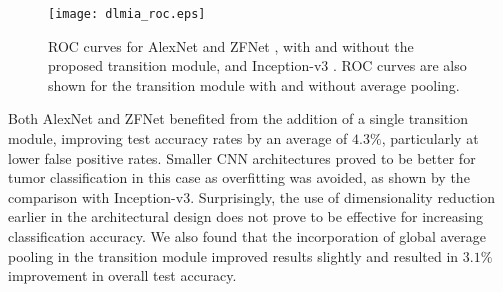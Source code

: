 \documentclass[runningheads,a4paper]{llncs}
\begin{document}
\begin{figure}[t]
	\centering
	\texttt{[image: dlmia\_roc.eps]}
	\caption{ROC curves for AlexNet \cite{Krizhevsky2012} and ZFNet \cite{Zeiler2013}, with and without the proposed transition module, and Inception-v3 \cite{Szegedy2016}. ROC curves are also shown for the transition module with and without average pooling.}
	\label{fig:roc}
\end{figure}



Both AlexNet and ZFNet benefited from the addition of a single transition module, improving test accuracy rates by an average of $4.3\%$, particularly at lower false positive rates. Smaller CNN architectures proved to be better for tumor classification in this case as overfitting was avoided, as shown by the comparison with Inception-v3. Surprisingly, the use of dimensionality reduction earlier in the architectural design does not prove to be effective for increasing classification accuracy.
We also found that the incorporation of global average pooling in the transition module improved results slightly and resulted in $3.1\%$ improvement in overall test accuracy. 
\end{document}
